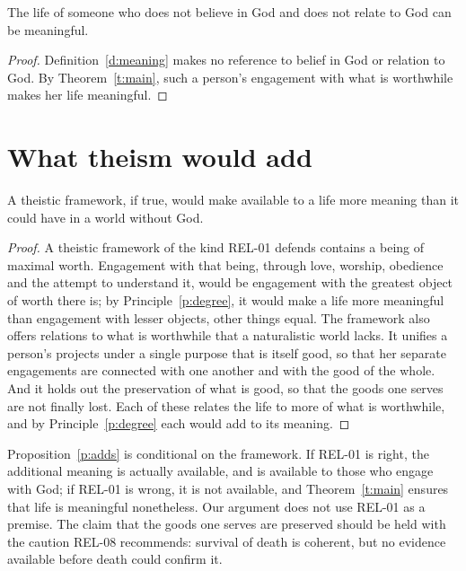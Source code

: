 \documentclass{situationist-preprint}
\begin{document}
\begin{corollary}\label{c:atheist}
The life of someone who does not believe in God and does not relate to God can be meaningful.
\end{corollary}

\begin{proof}
Definition~\ref{d:meaning} makes no reference to belief in God or relation to God. By Theorem~\ref{t:main}, such a person's engagement with what is worthwhile makes her life meaningful.
\end{proof}

\section{What theism would add}

\begin{proposition}\label{p:adds}
A theistic framework, if true, would make available to a life more meaning than it could have in a world without God.
\end{proposition}

\begin{proof}
A theistic framework of the kind REL-01 defends contains a being of maximal worth. Engagement with that being, through love, worship, obedience and the attempt to understand it, would be engagement with the greatest object of worth there is; by Principle~\ref{p:degree}, it would make a life more meaningful than engagement with lesser objects, other things equal. The framework also offers relations to what is worthwhile that a naturalistic world lacks. It unifies a person's projects under a single purpose that is itself good, so that her separate engagements are connected with one another and with the good of the whole. And it holds out the preservation of what is good, so that the goods one serves are not finally lost. Each of these relates the life to more of what is worthwhile, and by Principle~\ref{p:degree} each would add to its meaning.
\end{proof}

\begin{remark}\label{r:status}
Proposition~\ref{p:adds} is conditional on the framework. If REL-01 is right, the additional meaning is actually available, and is available to those who engage with God; if REL-01 is wrong, it is not available, and Theorem~\ref{t:main} ensures that life is meaningful nonetheless. Our argument does not use REL-01 as a premise. The claim that the goods one serves are preserved should be held with the caution REL-08 recommends: survival of death is coherent, but no evidence available before death could confirm it.
\end{remark}
\end{document}

